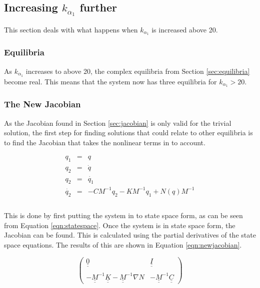 \subsection{Increasing $k_{\alpha_{1}}$ further}

This section deals with what happens when $k_{\alpha_{1}}$ is increased above 20. 

\subsubsection{Equilibria}

As $k_{\alpha_{1}}$ increases to above 20, the complex equilibria from Section \ref{sec:equilibria} become real. This means that the system now has three equilibria for $k_{\alpha_{1}} > 20$.

\subsubsection{The New Jacobian}
As the Jacobian found in Section \ref{sec:jacobian} is only valid for the trivial solution, the first step for finding solutions that could relate to other equilibria is to find the Jacobian that takes the nonlinear terms in to account. 

\begin{equation}
\label{eqn:statespace}
\begin{array}{lll}
q_{1} & = & {q} \\ 
q_{2} & = & \dot{q} \\
q_{2} & = & \dot{q_{1}}\\
\dot{q_{2}} & = & -CM^{-1}q_{2}-KM^{-1}q_{1}+N(q)M^{-1}\\
\end{array}
\end{equation}\\


\noindent This is done by first putting the system in to state space form, as can be seen from Equation \ref{eqn:statespace}. Once the system is in state space form, the Jacobian can be found. This is calculated using the partial derivatives of the state space equations. The results of this are shown in Equation \ref{eqn:newjacobian}.

\begin{equation} \label{eqn:newjacobian}
\begin{pmatrix}
  \underline{\underline{0}} & \underline{\underline{I}} \\ \\
  -\underline{\underline{M}}^{-1} \underline{\underline{K}} - \underline{\underline{M}}^{-1} \nabla N & -\underline{\underline{M}}^{-1} \underline{\underline{C}}
  \end{pmatrix}
  \end{equation} \\
  
